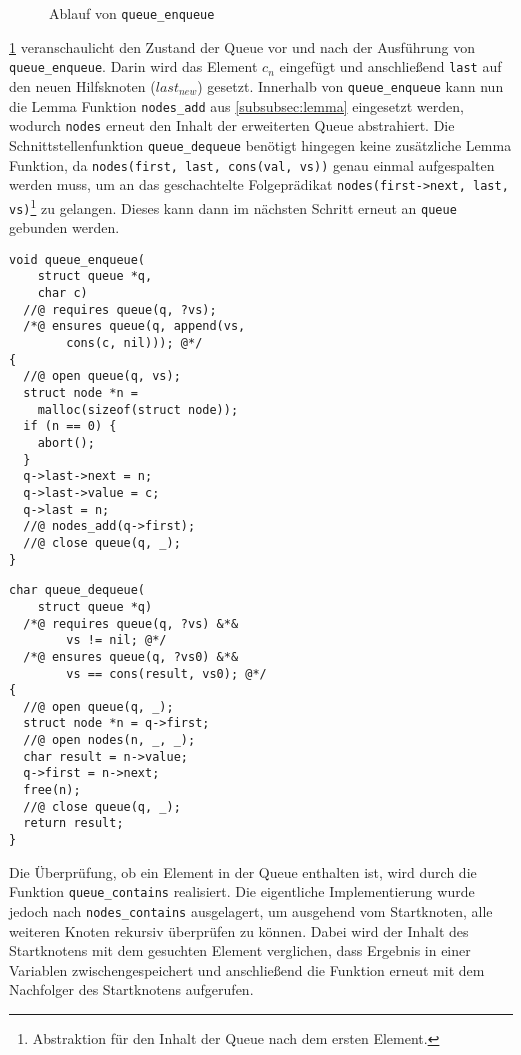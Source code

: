 \begin{figure}[b]
	\centering
	
	\caption{Ablauf von \texttt{queue\_enqueue}}
	\label{fig:list}
\end{figure}

\cref{fig:list} veranschaulicht den Zustand der Queue vor und nach der Ausführung von \texttt{queue\_enqueue}. Darin wird das Element $c_{n}$ eingefügt und anschließend \texttt{last} auf den neuen Hilfsknoten ($last_{new}$) gesetzt. Innerhalb von \texttt{queue\_enqueue} kann nun die Lemma Funktion \texttt{nodes\_add} aus \cref{subsubsec:lemma} eingesetzt werden, wodurch \texttt{nodes} erneut den Inhalt der erweiterten Queue abstrahiert. Die Schnittstellenfunktion \texttt{queue\_dequeue} benötigt hingegen keine zusätzliche Lemma Funktion, da \texttt{nodes(first, last, cons(val, vs))} genau einmal aufgespalten werden muss, um an das geschachtelte Folgeprädikat \texttt{nodes(first->next, last, vs)}\footnote{Abstraktion für den Inhalt der Queue nach dem ersten Element.} zu gelangen. Dieses kann dann im nächsten Schritt erneut an \texttt{queue} gebunden werden.

\vspace{-10pt}
{\noindent
\begin{minipage}[t]{.45\textwidth}
\begin{lstlisting}
void queue_enqueue(
    struct queue *q,
    char c)
  //@ requires queue(q, ?vs);
  /*@ ensures queue(q, append(vs,
        cons(c, nil))); @*/
{
  //@ open queue(q, vs);
  struct node *n =
    malloc(sizeof(struct node));
  if (n == 0) {
    abort();
  }
  q->last->next = n;
  q->last->value = c;
  q->last = n;
  //@ nodes_add(q->first);
  //@ close queue(q, _);
}
\end{lstlisting}
\end{minipage}
\hfill
\begin{minipage}[t]{.45\textwidth}
\begin{lstlisting}
char queue_dequeue(
    struct queue *q)
  /*@ requires queue(q, ?vs) &*&
        vs != nil; @*/
  /*@ ensures queue(q, ?vs0) &*&
        vs == cons(result, vs0); @*/
{
  //@ open queue(q, _);
  struct node *n = q->first;
  //@ open nodes(n, _, _);
  char result = n->value;
  q->first = n->next;
  free(n);
  //@ close queue(q, _);
  return result;
}
\end{lstlisting}
\end{minipage}
}

\noindent
Die Überprüfung, ob ein Element in der Queue enthalten ist, wird durch die Funktion \texttt{queue\_contains} realisiert. Die eigentliche Implementierung wurde jedoch nach \texttt{nodes\_contains} ausgelagert, um ausgehend vom Startknoten, alle weiteren Knoten rekursiv überprüfen zu können. Dabei wird der Inhalt des Startknotens mit dem gesuchten Element verglichen, dass Ergebnis in einer Variablen zwischengespeichert und anschließend die Funktion erneut mit dem Nachfolger des Startknotens aufgerufen.

